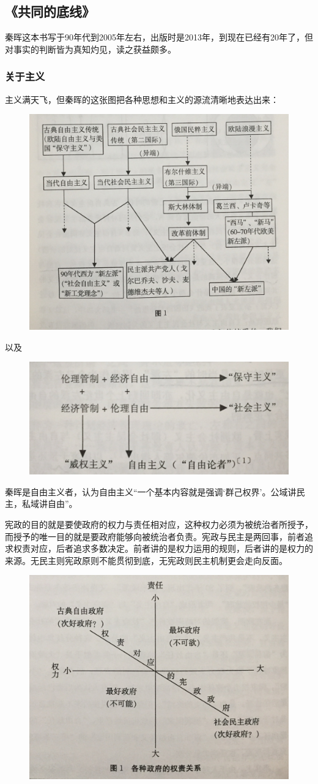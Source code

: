\subsection{《共同的底线》}
秦晖这本书写于90年代到2005年左右，出版时是2013年，到现在已经有20年了，但对事实的判断皆为真知灼见，读之获益颇多。

\subsubsection{关于主义}
主义满天飞，但秦晖的这张图把各种思想和主义的源流清晰地表达出来： 
\begin{figure}[htpb]
\centering
\includegraphics[width=0.5\linewidth]{images/zhuyi.jpg}
\end{figure}
以及
\begin{figure}[htpb]
\centering
\includegraphics[width=0.5\linewidth]{images/zhuyi2.jpg}
\end{figure}

秦晖是自由主义者，认为自由主义“一个基本内容就是强调‘群己权界’。公域讲民主，私域讲自由”。

宪政的目的就是要使政府的权力与责任相对应，这种权力必须为被统治者所授予，而授予的唯一目的就是要政府能够向被统治者负责。宪政与民主是两回事，前者追求权责对应，后者追求多数决定。前者讲的是权力运用的规则，后者讲的是权力的来源。无民主则宪政原则不能贯彻到底，无宪政则民主机制更会走向反面。 
\begin{figure}[htpb]
\centering
\includegraphics[width=0.5\linewidth]{images/zhengfu.jpg}
\end{figure}

